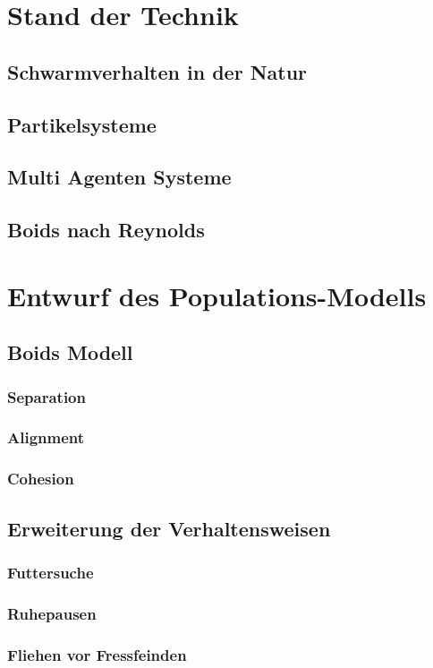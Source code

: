 \documentclass[draft=false
              ,paper=a4
              ,twoside=false
              ,fontsize=11pt
              ,headsepline
              ,BCOR10mm
              ,DIV11
              ,bibtotoc
              ,liststotoc
              ]{scrbook}
\begin{document}
\chapter{Stand der Technik}\label{stand}
\section{Schwarmverhalten in der Natur}
\section{Partikelsysteme}
\section{Multi Agenten Systeme}
\section{Boids nach Reynolds}

\chapter{Entwurf des Populations-Modells}\label{modell}
\section{Boids Modell}
\subsection{Separation}
\subsection{Alignment}
\subsection{Cohesion}

\section{Erweiterung der Verhaltensweisen}
\subsection{Futtersuche}
\subsection{Ruhepausen}
\subsection{Fliehen vor Fressfeinden}
\end{document}
